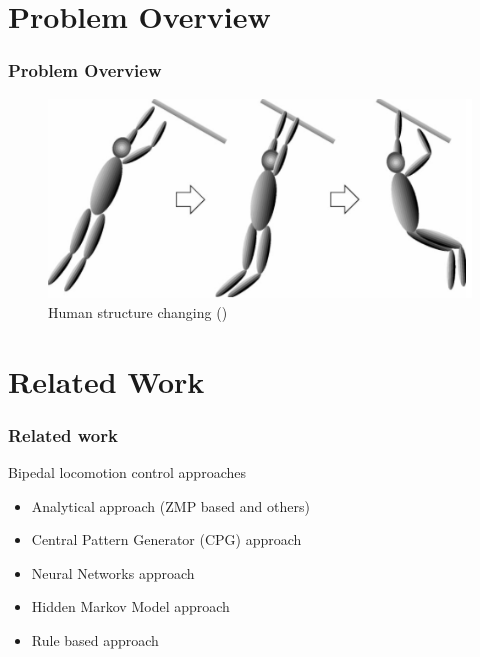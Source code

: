 \documentclass{beamer}
\begin{document}
	\section*{Problem Overview}
	\begin{frame}
		\frametitle{Problem Overview}
		\begin{figure}[h!]
			\begin{minipage}[H]{\linewidth}
				\centering
				\includegraphics[scale=0.5]{presentation_images/32}
				\caption{Human structure changing (\cite{nakamura2000dynamics})}
			\end{minipage}
		\end{figure}
	\end{frame}
		

	\section*{Related Work}
	\begin{frame}
		\frametitle{Related work}
		\begin{block}{Bipedal locomotion control approaches}
			\begin{itemize}
				\item
					Analytical approach (ZMP based and others)
				\item
					Central Pattern Generator (CPG) approach
				\item
					Neural Networks approach
				\item 
					Hidden Markov Model approach
				\item
					Rule based approach
			\end{itemize}
		\end{block}
	\end{frame}

\end{document}
